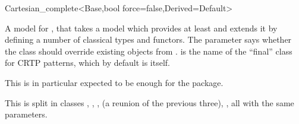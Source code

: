 \begin{ccRefClass}{Cartesian_complete<Base,bool force=false,Derived=Default>}

\ccDefinition
A model for , that takes a  model 
which provides at least  and extends it by defining a number
of classical types and functors.  The  parameter says whether
the class should override existing objects from .
 is the name of the ``final'' class for CRTP patterns,
which by default is  itself.

This is in particular expected to be enough for the 
package.

\ccIsModel
{}

\ccImplementation
This is split in classes ,
,
, 
 (a reunion of the previous three), 
, all with the same parameters.

\end{ccRefClass}
